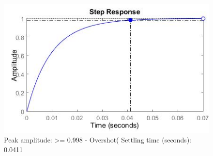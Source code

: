 \begin{figure}[h!]
\centering
\includegraphics[scale=0.7]{Billeder/PDStep.jpg}
\caption{ Peak amplitude: >= 0.998 - Overshot(%
		 Settling time (seconds): 0.0411 }
\label{fig:PDStep}
\end{figure}




































